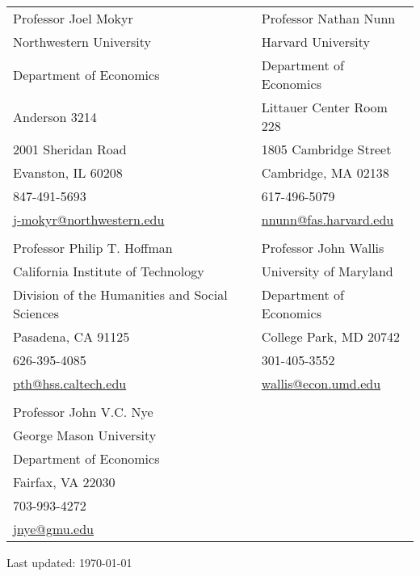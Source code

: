 \documentclass[11pt,fullpage]{article}
\begin{document}
\begin{tabular}{l@{\hskip 1in}l}
	Professor Joel Mokyr & Professor Nathan Nunn \\
	Northwestern University &  Harvard University\\
	Department of Economics & Department of Economics \\
	Anderson 3214 &  Littauer Center Room 228 \\ 
	2001 Sheridan Road & 1805 Cambridge Street  \\
	Evanston, IL 60208 & Cambridge, MA 02138  \\
	847-491-5693 & 617-496-5079 \\
	\href{mailto:j-mokyr@northwestern.edu}{j-mokyr@northwestern.edu} & \href{mailto:nnunn@fas.harvard.edu}{nnunn@fas.harvard.edu}  \\
	\vspace{.5cm} \\
	Professor Philip T. Hoffman &  Professor John Wallis\\
	California Institute of Technology & University of Maryland\\
	Division of the Humanities and Social Sciences & Department of Economics\\
	Pasadena, CA 91125 &  College Park, MD 20742\\ 
	626-395-4085 & 301-405-3552\\
	\href{mailto:pth@hss.caltech.edu}{pth@hss.caltech.edu} &  \href{mailto:wallis@econ.umd.edu}{wallis@econ.umd.edu} \\
	\vspace{.5cm} \\
	Professor John V.C. Nye \\
	George Mason University \\
	Department of Economics \\
	Fairfax, VA 22030 \\ 
	703-993-4272 \\
	\href{mailto:jnye@gmu.edu}{jnye@gmu.edu}  \\
\end{tabular}
	
	
\bigskip
\begin{center}
  \begin{footnotesize}
    Last updated: \today
  \end{footnotesize}
\end{center}

\end{document}
